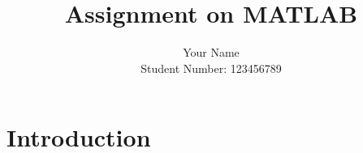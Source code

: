 \documentclass[a4paper,12pt]{article}
\title{Assignment on MATLAB}
\author{Your Name \\ Student Number: 123456789}
\date{}
\begin{document}
\maketitle
\thispagestyle{empty} %
\newpage

\section*{Introduction}
\lipsum[1] %

\newpage

\end{document}
